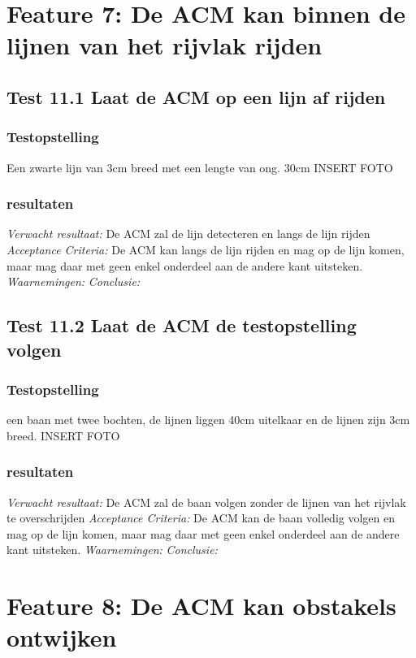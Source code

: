 \documentclass{article}
\begin{document}
\section{Feature 7: De ACM kan binnen de lijnen van het rijvlak rijden}
\subsection{Test 11.1 Laat de ACM op een lijn af rijden}
\subsubsection{Testopstelling}
Een zwarte lijn van 3cm breed met een lengte van ong. 30cm
INSERT FOTO
\subsubsection{resultaten}
\textit{Verwacht resultaat: }De ACM zal de lijn detecteren en langs de lijn rijden
\newline
\textit{Acceptance Criteria: }De ACM kan langs de lijn rijden en mag op de lijn komen, maar mag daar met geen enkel onderdeel aan de andere kant uitsteken.
\newline
\textit{Waarnemingen: }
\newline
\textit{Conclusie: }

\subsection{Test 11.2 Laat de ACM de testopstelling volgen}
\subsubsection{Testopstelling}
een baan met twee bochten, de lijnen liggen 40cm uitelkaar en de lijnen zijn 3cm breed.
INSERT FOTO
\subsubsection{resultaten}
\textit{Verwacht resultaat: }De ACM zal de baan volgen zonder de lijnen van het rijvlak te overschrijden
\newline
\textit{Acceptance Criteria: }De ACM kan de baan volledig volgen en mag op de lijn komen, maar mag daar met geen enkel onderdeel aan de andere kant uitsteken.
\newline
\textit{Waarnemingen: }
\newline
\textit{Conclusie: }

\section{Feature 8: De ACM kan obstakels ontwijken}
\end{document}

